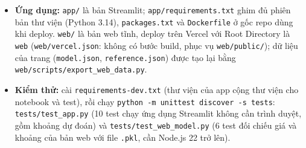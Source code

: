 \documentclass[11pt]{article}
\begin{document}
\begin{itemize}
          (tham số, chỉ số, mã băm), \nolinkurl{README.md} và \nolinkurl{requirements-model.txt}. Mô hình của lần đánh
          giá đầu vẫn giữ ở \nolinkurl{models/candidates/final_v2_2026-10-20/}, cấu hình chọn và kết quả test của nó ở
          \nolinkurl{experiments/final_selection/}.
    \item \textbf{Ứng dụng:} \nolinkurl{app/} là bản Streamlit; \nolinkurl{app/requirements.txt} ghim đủ phiên bản thư
          viện (Python 3.14), \texttt{packages.txt} và \texttt{Dockerfile} ở gốc repo dùng khi deploy.
          \nolinkurl{web/} là bản web tĩnh, deploy trên Vercel với Root Directory là \nolinkurl{web}
          (\nolinkurl{web/vercel.json}: không có bước build, phục vụ \nolinkurl{web/public/}); dữ liệu của trang
          (\texttt{model.json}, \texttt{reference.json}) được tạo lại bằng \nolinkurl{web/scripts/export_web_data.py}.
    \item \textbf{Kiểm thử:} cài \nolinkurl{requirements-dev.txt} (thư viện của app cộng thư viện cho notebook và test),
          rồi chạy \texttt{python -m unittest discover -s tests}: \nolinkurl{tests/test_app.py} (10 test chạy
          ứng dụng Streamlit không cần trình duyệt, gồm khoảng dự đoán) và \nolinkurl{tests/test_web_model.py} (6 test
          đối chiếu giá và khoảng của bản web với file \texttt{.pkl}, cần Node.js 22 trở lên).
\end{itemize}
\end{document}
